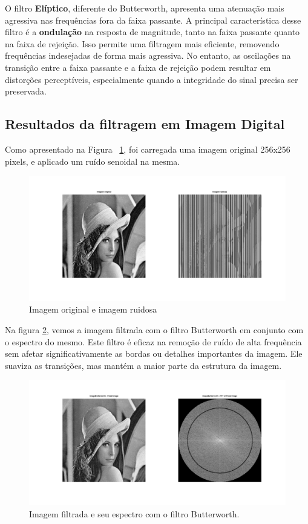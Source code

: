 O filtro \textbf{Elíptico}, diferente do Butterworth, apresenta uma atenuação mais agressiva nas frequências fora da faixa passante. A principal característica desse filtro é a \textbf{ondulação} na resposta de magnitude, tanto na faixa passante quanto na faixa de rejeição. Isso permite uma filtragem mais eficiente, removendo frequências indesejadas de forma mais agressiva. No entanto, as oscilações na transição entre a faixa passante e a faixa de rejeição podem resultar em distorções perceptíveis, especialmente quando a integridade do sinal precisa ser preservada.

\subsection{Resultados da filtragem em Imagem Digital}
Como apresentado na Figura ~\ref{fig:image_original_plus_noise}, foi carregada uma imagem original 256x256 pixels, e aplicado um ruído senoidal na mesma.

\begin{figure}[H]
    \centering
    \includegraphics[width=1\linewidth]{03_results/assets/image_original_plus_noise.png}
    \caption{Imagem original e imagem ruidosa}
    \label{fig:image_original_plus_noise}
\end{figure}

Na figura \ref{fig:image_butterworth}, vemos a imagem filtrada com o filtro Butterworth em conjunto com o espectro do mesmo. Este filtro é eficaz na remoção de ruído de alta frequência sem afetar significativamente as bordas ou detalhes importantes da imagem. Ele suaviza as transições, mas mantém a maior parte da estrutura da imagem.

\begin{figure}[H]
    \centering
    \includegraphics[width=1\linewidth]{03_results/assets/image_butterworth.png}
    \caption{Imagem filtrada e seu espectro com o filtro Butterworth.}
    \label{fig:image_butterworth}
\end{figure}

